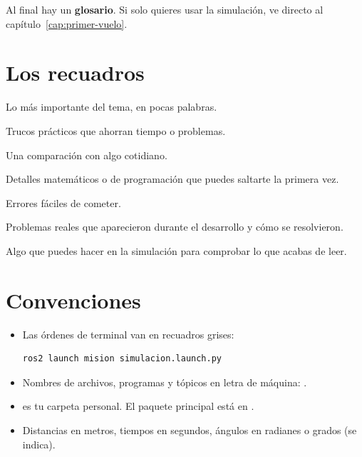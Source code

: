 Al final hay un \textbf{glosario}. Si solo quieres usar la simulación, ve directo al
capítulo~\ref{cap:primer-vuelo}.

\section*{Los recuadros}

\begin{recuerda}
Lo más importante del tema, en pocas palabras.
\end{recuerda}
\begin{consejo}
Trucos prácticos que ahorran tiempo o problemas.
\end{consejo}
\begin{ejemplo}
Una comparación con algo cotidiano.
\end{ejemplo}
\begin{tecnico}
Detalles matemáticos o de programación que puedes saltarte la primera vez.
\end{tecnico}
\begin{aviso}
Errores fáciles de cometer.
\end{aviso}
\begin{leccion}
Problemas reales que aparecieron durante el desarrollo y cómo se resolvieron.
\end{leccion}
\begin{ejercicio}
Algo que puedes hacer en la simulación para comprobar lo que acabas de leer.
\end{ejercicio}

\section*{Convenciones}

\begin{itemize}
  \item Las órdenes de terminal van en recuadros grises:
\begin{lstlisting}[style=bash]
ros2 launch mision simulacion.launch.py
\end{lstlisting}
  \item Nombres de archivos, programas y tópicos en letra de máquina: .
  \item \cod{~} es tu carpeta personal. El paquete principal está en .
  \item Distancias en metros, tiempos en segundos, ángulos en radianes o grados (se indica).
\end{itemize}
